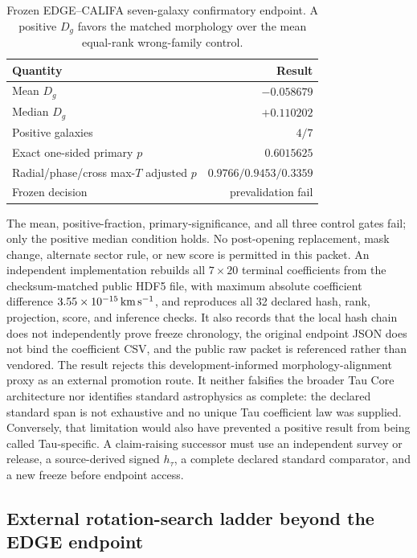 \documentclass[11pt]{article}
\begin{document}
\begin{table}[H]
\centering
\caption{Frozen EDGE--CALIFA seven-galaxy confirmatory endpoint.  A positive
\(D_g\) favors the matched morphology over the mean equal-rank wrong-family
control.}
\small
\begin{tabular}{lr}
\toprule
Quantity & Result\\
\midrule
Mean \(D_g\) & \(-0.058679\)\\
Median \(D_g\) & \(+0.110202\)\\
Positive galaxies & \(4/7\)\\
Exact one-sided primary \(p\) & \(0.6015625\)\\
Radial/phase/cross max-\(T\) adjusted \(p\) & \(0.9766/0.9453/0.3359\)\\
Frozen decision & prevalidation fail\\
\bottomrule
\end{tabular}
\label{tab:edge-califa-confirmatory}
\end{table}

The mean, positive-fraction, primary-significance, and all three control gates
fail; only the positive median condition holds.  No post-opening replacement,
mask change, alternate sector rule, or new score is permitted in this packet.
An independent implementation rebuilds all \(7\times20\) terminal coefficients
from the checksum-matched public HDF5 file, with maximum absolute coefficient
difference \(3.55\times10^{-15}\,{\rm km\,s^{-1}}\), and reproduces all 32
declared hash, rank, projection, score, and inference checks.  It also records
that the local hash chain does not independently prove freeze chronology, the
original endpoint JSON does not bind the coefficient CSV, and the public raw
packet is referenced rather than vendored.
The result rejects this development-informed morphology-alignment proxy as an
external promotion route.  It neither falsifies the broader Tau Core
architecture nor identifies standard astrophysics as complete: the declared
standard span is not exhaustive and no unique Tau coefficient law was supplied.
Conversely, that limitation would also have prevented a positive result from
being called Tau-specific.  A claim-raising successor must use an independent
survey or release, a source-derived signed \(h_{\tau}\), a complete declared
standard comparator, and a new freeze before endpoint access.

\subsection{External rotation-search ladder beyond the EDGE endpoint}
\end{document}

